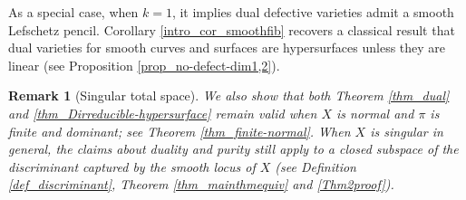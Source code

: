 \documentclass[12pt]{amsart}
\newtheorem{remark}[theorem]{Remark}
\begin{document}
As a special case, when $k=1$, it implies dual defective varieties admit a smooth Lefschetz pencil. Corollary \ref{intro_cor_smoothfib} recovers a classical result that dual varieties for smooth curves and surfaces are hypersurfaces unless they are linear (see Proposition \ref{prop_no-defect-dim1,2}).

\begin{remark}[Singular total space]\normalfont
 We also show that both Theorem \ref{thm_dual} and \ref{thm_Dirreducible-hypersurface} remain valid when $X$ is normal and $\pi$ is finite and dominant; see Theorem \ref{thm_finite-normal}. When $X$ is singular in general, the claims about duality and purity still apply to a closed subspace of the discriminant captured by the smooth locus of $X$ (see Definition \ref{def_discriminant}, Theorem \ref{thm_mainthmequiv} and \ref{Thm2proof}). %
\end{remark}
\end{document}
